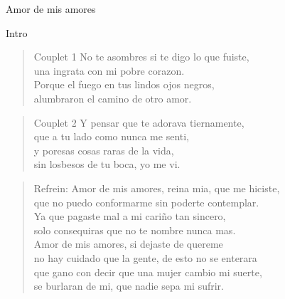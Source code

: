 \begin{song}[vals]{Amor de mis amores}
\begin{instrumental}{Intro}
	  \measure{}\measure{}\measure{\hspace{4.2em}:}
\end{instrumental}

\begin{verse}{Couplet 1}
No te asombres si te digo lo que fuiste,\\
una ingrata con mi pobre corazon.\\
Porque el fuego en tus lindos ojos negros,\\
alumbraron el camino de otro amor.\\
\end{verse}
\begin{verse}{Couplet 2}
Y pensar que te adorava tiernamente,\\
que a tu lado como nunca me senti,\\
y poresas cosas raras de la vida,\\
sin losbesos de tu boca, yo me vi.\\
\end{verse}
\begin{verse}{Refrein:}
Amor de mis amores, reina mia, que me hiciste,\\
que no puedo conformarme sin poderte contemplar.\\
\hspace{1em}Ya que pagaste mal a mi cariño tan sincero,\\
solo consequiras que no te nombre nunca mas.\\
Amor de mis amores, si dejaste de quereme\\
no hay cuidado que la gente, de esto no se enterara\\
\hspace{1em}que gano con decir que una mujer cambio mi suerte,\\
se burlaran de mi, que nadie sepa mi sufrir.
\end{verse}


\end{song}
